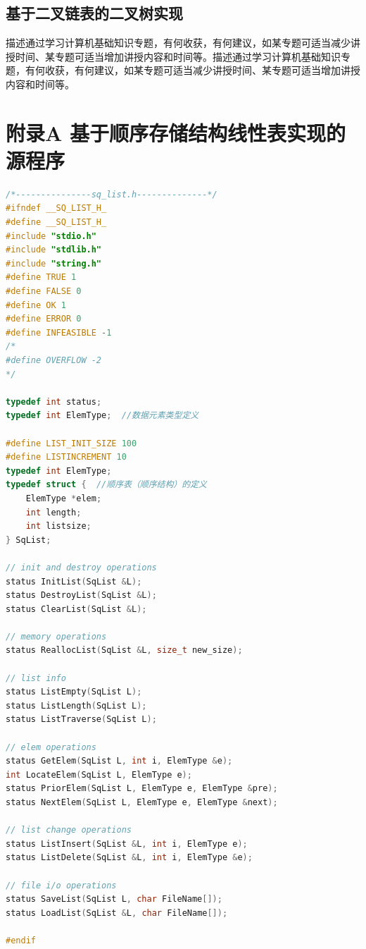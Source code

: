 \documentclass[supercite]{Experimental_Report}
\theoremstyle{definition}
\begin{document}
\subsection{基于二叉链表的二叉树实现}

描述通过学习计算机基础知识专题，有何收获，有何建议，如某专题可适当减少讲授时间、某专题可适当增加讲授内容和时间等。描述通过学习计算机基础知识专题，有何收获，有何建议，如某专题可适当减少讲授时间、某专题可适当增加讲授内容和时间等。




\appendix

\section{附录A 基于顺序存储结构线性表实现的源程序}

\begin{lstlisting}[caption={$sq\_list.h$}, language=C++, frame=single]
/*---------------sq_list.h--------------*/
#ifndef __SQ_LIST_H_
#define __SQ_LIST_H_
#include "stdio.h"
#include "stdlib.h"
#include "string.h"
#define TRUE 1
#define FALSE 0
#define OK 1
#define ERROR 0
#define INFEASIBLE -1
/*
#define OVERFLOW -2
*/

typedef int status;
typedef int ElemType;  //数据元素类型定义

#define LIST_INIT_SIZE 100
#define LISTINCREMENT 10
typedef int ElemType;
typedef struct {  //顺序表（顺序结构）的定义
    ElemType *elem;
    int length;
    int listsize;
} SqList;

// init and destroy operations
status InitList(SqList &L);
status DestroyList(SqList &L);
status ClearList(SqList &L);

// memory operations
status ReallocList(SqList &L, size_t new_size);

// list info
status ListEmpty(SqList L);
status ListLength(SqList L);
status ListTraverse(SqList L);

// elem operations
status GetElem(SqList L, int i, ElemType &e);
int LocateElem(SqList L, ElemType e);
status PriorElem(SqList L, ElemType e, ElemType &pre);
status NextElem(SqList L, ElemType e, ElemType &next);

// list change operations
status ListInsert(SqList &L, int i, ElemType e);
status ListDelete(SqList &L, int i, ElemType &e);

// file i/o operations
status SaveList(SqList L, char FileName[]);
status LoadList(SqList &L, char FileName[]);

#endif
\end{lstlisting}
\end{document}
